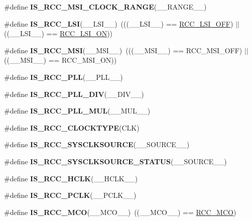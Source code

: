 \begin{DoxyCompactItemize}
\item 
\#define {\bfseries I\-S\-\_\-\-R\-C\-C\-\_\-\-M\-S\-I\-\_\-\-C\-L\-O\-C\-K\-\_\-\-R\-A\-N\-G\-E}(\-\_\-\-\_\-\-R\-A\-N\-G\-E\-\_\-\-\_\-)
\item 
\hypertarget{group___r_c_c___private___macros_ga2961f77a4ee7870f36d9f7f6729a0608}{\#define {\bfseries I\-S\-\_\-\-R\-C\-C\-\_\-\-L\-S\-I}(\-\_\-\-\_\-\-L\-S\-I\-\_\-\-\_\-)~(((\-\_\-\-\_\-\-L\-S\-I\-\_\-\-\_\-) == \hyperlink{group___r_c_c___l_s_i___config_gaa1710927d79a2032f87f039c4a27356a}{R\-C\-C\-\_\-\-L\-S\-I\-\_\-\-O\-F\-F}) $\vert$$\vert$ ((\-\_\-\-\_\-\-L\-S\-I\-\_\-\-\_\-) == \hyperlink{group___r_c_c___l_s_i___config_ga6b364ac3500e60b6bff695ee518c87d6}{R\-C\-C\-\_\-\-L\-S\-I\-\_\-\-O\-N}))}\label{group___r_c_c___private___macros_ga2961f77a4ee7870f36d9f7f6729a0608}

\item 
\hypertarget{group___r_c_c___private___macros_gac570b69943ae13dc611be7cf1216a76e}{\#define {\bfseries I\-S\-\_\-\-R\-C\-C\-\_\-\-M\-S\-I}(\-\_\-\-\_\-\-M\-S\-I\-\_\-\-\_\-)~(((\-\_\-\-\_\-\-M\-S\-I\-\_\-\-\_\-) == R\-C\-C\-\_\-\-M\-S\-I\-\_\-\-O\-F\-F) $\vert$$\vert$ ((\-\_\-\-\_\-\-M\-S\-I\-\_\-\-\_\-) == R\-C\-C\-\_\-\-M\-S\-I\-\_\-\-O\-N))}\label{group___r_c_c___private___macros_gac570b69943ae13dc611be7cf1216a76e}

\item 
\#define {\bfseries I\-S\-\_\-\-R\-C\-C\-\_\-\-P\-L\-L}(\-\_\-\-\_\-\-P\-L\-L\-\_\-\-\_\-)
\item 
\#define {\bfseries I\-S\-\_\-\-R\-C\-C\-\_\-\-P\-L\-L\-\_\-\-D\-I\-V}(\-\_\-\-\_\-\-D\-I\-V\-\_\-\-\_\-)
\item 
\#define {\bfseries I\-S\-\_\-\-R\-C\-C\-\_\-\-P\-L\-L\-\_\-\-M\-U\-L}(\-\_\-\-\_\-\-M\-U\-L\-\_\-\-\_\-)
\item 
\#define {\bfseries I\-S\-\_\-\-R\-C\-C\-\_\-\-C\-L\-O\-C\-K\-T\-Y\-P\-E}(C\-L\-K)
\item 
\#define {\bfseries I\-S\-\_\-\-R\-C\-C\-\_\-\-S\-Y\-S\-C\-L\-K\-S\-O\-U\-R\-C\-E}(\-\_\-\-\_\-\-S\-O\-U\-R\-C\-E\-\_\-\-\_\-)
\item 
\#define {\bfseries I\-S\-\_\-\-R\-C\-C\-\_\-\-S\-Y\-S\-C\-L\-K\-S\-O\-U\-R\-C\-E\-\_\-\-S\-T\-A\-T\-U\-S}(\-\_\-\-\_\-\-S\-O\-U\-R\-C\-E\-\_\-\-\_\-)
\item 
\#define {\bfseries I\-S\-\_\-\-R\-C\-C\-\_\-\-H\-C\-L\-K}(\-\_\-\-\_\-\-H\-C\-L\-K\-\_\-\-\_\-)
\item 
\#define {\bfseries I\-S\-\_\-\-R\-C\-C\-\_\-\-P\-C\-L\-K}(\-\_\-\-\_\-\-P\-C\-L\-K\-\_\-\-\_\-)
\item 
\hypertarget{group___r_c_c___private___macros_ga9fa7b8751b8f868f0f1dd55b6efced65}{\#define {\bfseries I\-S\-\_\-\-R\-C\-C\-\_\-\-M\-C\-O}(\-\_\-\-\_\-\-M\-C\-O\-\_\-\-\_\-)~((\-\_\-\-\_\-\-M\-C\-O\-\_\-\-\_\-) == \hyperlink{group___r_c_c___m_c_o___index_gad9bc2abe13f0d3e62a5f9aa381927eb3}{R\-C\-C\-\_\-\-M\-C\-O})}\label{group___r_c_c___private___macros_ga9fa7b8751b8f868f0f1dd55b6efced65}


\end{DoxyCompactItemize}
